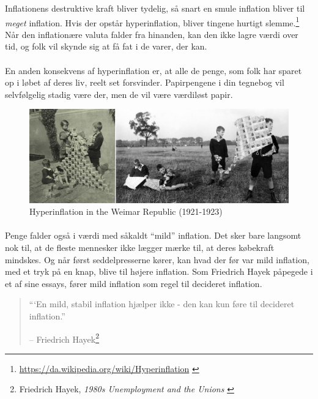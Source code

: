 \documentclass[paper=6in:9in,pagesize=pdftex,
               headinclude=on,footinclude=on,12pt]{scrbook}
\begin{document}
Inflationens destruktive kraft bliver tydelig, så snart en smule inflation bliver til \textit{meget} inflation. Hvis der opstår hyperinflation, bliver tingene hurtigt slemme.\footnote{\url{https://da.wikipedia.org/wiki/Hyperinflation} \cite{wiki:hyperinflation}} Når den inflationære valuta falder fra hinanden, kan den ikke lagre værdi over tid, og folk vil skynde sig at få fat i de varer, der kan.\paragraph{} En anden konsekvens af hyperinflation er, at alle de penge, som folk har sparet op i løbet af deres liv, reelt set forsvinder. Papirpengene i din tegnebog vil selvfølgelig stadig være der, men de vil være værdiløst papir.\begin{figure}
  \includegraphics{assets/images/children-playing-with-money.png}
  \caption{Hyperinflation in the Weimar Republic (1921-1923)}
  \label{fig:children-playing-with-money}
\end{figure}

\paragraph{} Penge falder også i værdi med såkaldt \enquote{mild} inflation. Det sker bare langsomt nok til, at de fleste mennesker ikke lægger mærke til, at deres købekraft mindskes. Og når først seddelpresserne kører, kan hvad der før var mild inflation, med et tryk på en knap, blive til højere inflation. Som Friedrich Hayek påpegede i et af sine essays, fører mild inflation som regel til decideret inflation.\begin{quotation}\begin{samepage} \enquote{`En mild, stabil inflation hjælper ikke - den kan kun føre til decideret inflation.} \begin{flushright} -- Friedrich Hayek\footnote{Friedrich Hayek, \textit{1980s Unemployment and the Unions} \cite{hayek-inflation}}
\end{flushright}\end{samepage}\end{quotation}
\end{document}
